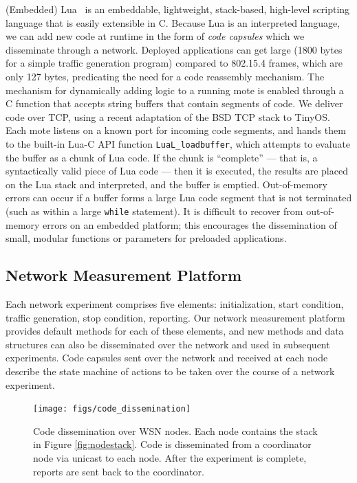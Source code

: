 (Embedded) Lua~\cite{elua} is an embeddable, lightweight, stack-based, high-level scripting language that is easily extensible in C.
Because Lua is an interpreted language, we can add new code at runtime in the form of \emph{code capsules} which we disseminate through a network.
Deployed applications can get large (1800 bytes for a simple traffic generation program) compared to 802.15.4 frames, which are only 127 bytes, predicating the need for a code reassembly mechanism.
The mechanism for dynamically adding logic to a running mote is enabled through a C function that accepts string buffers that contain segments of code.
We deliver code over TCP, using a recent adaptation of the BSD TCP stack to TinyOS.
Each mote listens on a known port for incoming code segments, and hands them to the built-in Lua-C API function \texttt{LuaL\_loadbuffer}, which attempts to evaluate the buffer as a chunk of Lua code.
If the chunk is ``complete'' --- that is, a syntactically valid piece of Lua code --- then it is executed, the results are placed on the Lua stack and interpreted, and the buffer is emptied.
Out-of-memory errors can occur if a buffer forms a large Lua code segment that is not terminated (such as within a large \texttt{while} statement).
It is difficult to recover from out-of-memory errors on an embedded platform; this encourages the dissemination of small, modular functions or parameters for preloaded applications.


\subsection{Network Measurement Platform}

Each network experiment comprises five elements: initialization, start condition, traffic generation, stop condition, reporting.
Our network measurement platform provides default methods for each of these elements, and new methods and data structures can also be disseminated over the network and used in subsequent experiments.
Code capsules sent over the network and received at each node describe the state machine of actions to be taken over the course of a network experiment.

\begin{figure}[ht]
\centering
\texttt{[image: figs/code\_dissemination]}
\caption{Code dissemination over WSN nodes. Each node contains the stack in Figure \ref{fig:nodestack}. Code is disseminated from a coordinator node via unicast to each node. After the experiment is complete, reports are sent back to the coordinator.}
\label{fig:dissemination}
\end{figure}

